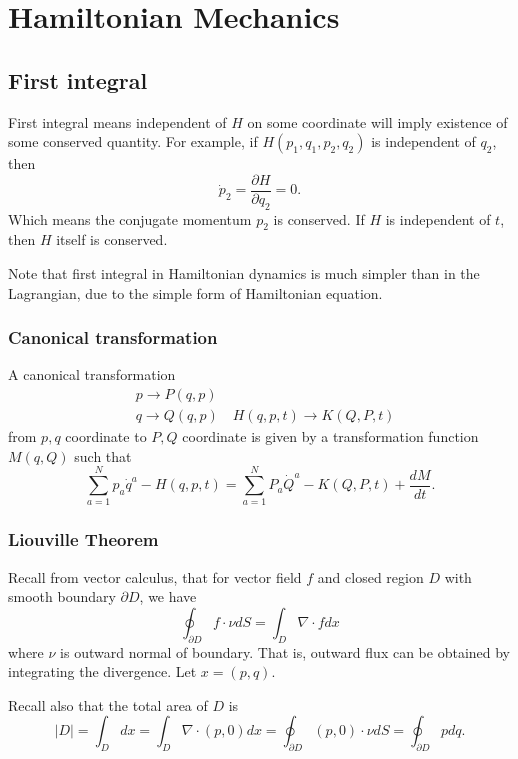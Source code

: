 
\section{Hamiltonian Mechanics}

\subsection{First integral}

First integral means independent of $H$ on some coordinate will imply existence of some conserved quantity. For example, if $H(p_1, q_1, p_2, q_2)$ is independent of $q_2$, then
\[
	\dot{p}_2 = \frac{\partial H}{\partial q_2}  = 0
.\] 
Which means the conjugate momentum $p_2$ is conserved. If $H$ is independent of $t$, then $H$ itself is conserved. 

Note that first integral in Hamiltonian dynamics is much simpler than in the Lagrangian, due to the simple form of Hamiltonian equation.




\subsubsection{Canonical transformation}

A canonical transformation 
\[
\begin{aligned}
& p \rightarrow P(q, p) \\
& q \rightarrow Q(q, p) \quad H(q, p, t) \rightarrow K(Q, P, t)
\end{aligned}
\]
from $p, q$ coordinate to $P, Q$ coordinate is given by a transformation function $M(q, Q)$ such that
\[
\sum_{a=1}^N p_a \dot{q}^a-H(q, p, t)=\sum_{a=1}^N P_a \dot{Q}^a-K(Q, P, t)+\frac{d M}{d t}
.\]

\subsubsection{Liouville Theorem}

Recall from vector calculus, that for vector field $f$ and closed region $D$ with smooth boundary $\partial D$, we have
\[
	\oint_{\partial D} f \cdot  \nu dS = \int _D \nabla \cdot f d x
\] 
where $\nu$ is outward normal of boundary.
That is, outward flux can be obtained by integrating the divergence. Let $x = (p, q)$.

Recall also that the total area of $D$ is
\[
	|D| = \int _D d x 
	= \int _D \nabla \cdot (p, 0) d x
	= \oint_{\partial D} (p, 0) \cdot  \nu d S 
	= \oint_{\partial D} p dq
.\] 

